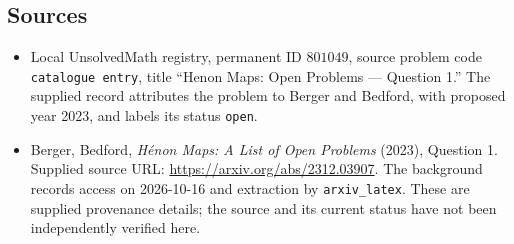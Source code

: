 \documentclass[11pt]{article}
\begin{document}
\subsection{Sources}
\begin{itemize}
\item Local UnsolvedMath registry, permanent ID \(801049\), source problem code \texttt{catalogue entry}, title ``Henon Maps: Open Problems --- Question 1.'' The supplied record attributes the problem to Berger and Bedford, with proposed year 2023, and labels its status \texttt{open}.
\item Berger, Bedford, \emph{H\'enon Maps: A List of Open Problems} (2023), Question 1. Supplied source URL: \url{https://arxiv.org/abs/2312.03907}. The background records access on 2026-10-16 and extraction by \texttt{arxiv\_latex}. These are supplied provenance details; the source and its current status have not been independently verified here.
\end{itemize}
\end{document}
